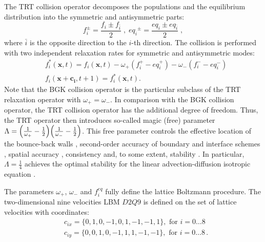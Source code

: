 \documentclass{article}
\newcommand{\beqal}{\begin{equation}\begin{aligned}}
\newcommand{\feqal}{\end{aligned}\end{equation}}
\newcommand{\omegaplus}{\omega_{+}}
\newcommand{\omegaminus}{\omega_{-}}
\begin{document}
The TRT collision operator \cite{ginzburg-boundary-main}
decomposes the populations and the equilibrium
distribution into the symmetric and antisymmetric parts:
\begin{equation}
\label{trtdecomp}
f^{\pm}_i=\frac{f_i\pm f_{\bar{i}}}{2}\;,\; 
{eq_i}^{\pm}=\frac{eq_i\pm eq_{\bar{i}}}{2}\;,
\end{equation}
where $\bar{i}$ is the opposite direction to the $i$-th direction.
The collision is performed with two independent relaxation rates for 
symmetric and antisymmetric modes:
\begin{equation}
\label{trt}
\begin{aligned}
&f_i^{*}(\bm{x},t)=f_i(\bm{x},t)-\omegaplus (f_i^{+} - eq_i^+)-\omegaminus
(f_i^{-} -
eq_i^-)\\
&f_i(\bm{x}+\bm{c_i},t+1)=f_i^{*}(\bm{x},t).
\end{aligned}
\end{equation}
Note that the BGK collision operator is the particular subclass of the TRT relaxation operator with
$\omegaplus=\omegaminus$. In comparison with the BGK collision operator,
the TRT collision operator has the additional degree of freedom. Thus, the TRT operator then
introduces
so-called magic (free) parameter
$\Lambda=\Bigl(\frac{1}{\omegaplus}-\frac{1}{2}\Bigr)\Bigl(\frac{1}{\omegaminus}-\frac{1}{2}
\Bigr)$. 
This free parameter controls the effective location of the bounce-back
walls \cite{ginzburg-multireflection}, second-order accuracy of
boundary \cite{ginzburg-boundary-main} and interface schemes \cite{ginzburg-discontinious}, 
spatial accuracy \cite{ginzburg-recurrence,servan-trt-stability},
consistency \cite{ginzburg-brinkman} and, to some extent,
stability \cite{kuzmin-stability-optimal,kuzmin-d1q3,servan-trt-stability}.
In particular, $\Lambda=\frac{1}{4}$ achieves the optimal stability for the
linear advection-diffusion isotropic equation \cite{kuzmin-stability-optimal}. 

The parameters $\omegaplus$, $\omegaminus$ and $f_i^{eq}$ fully define the lattice Boltzmann
procedure. The two-dimensional nine velocities LBM $D2Q9$ is defined on the set of lattice
velocities with coordinates:
\beqal
&c_{ix}=\{0,1,0,-1,0,1,-1,-1,1\},\text{ for } i=0\dots8\\
&c_{iy}=\{0,0,1,0,-1,1,1,-1,-1\},\text{ for } i=0\dots8\,.
\feqal
\end{document}
